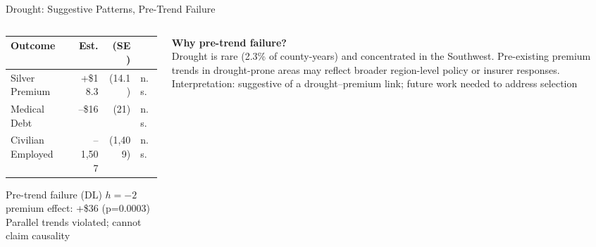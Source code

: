 \documentclass[aspectratio=169,11pt]{beamer}
\newcommand{\tealtext}[1]{{\color{Teal}#1}}
\newcommand{\graytext}[1]{{\color{WarmGray}#1}}
\begin{document}
\begin{frame}{Drought: Suggestive Patterns, Pre-Trend Failure}
  \begin{columns}[T]
    \begin{column}{0.56\textwidth}
      \small
      \begin{tabular}{lrrl}
        \toprule
        Outcome & Est. & (SE) & \\
        \midrule
        Silver Premium & +\$18.3 & (14.1) & \graytext{n.s.} \\
        Medical Debt & --\$16 & (21) & \graytext{n.s.} \\
        Civilian Employed & --1,507 & (1,409) & \graytext{n.s.} \\
        \bottomrule
      \end{tabular}
      \vspace{0.5em}
      \begin{alertblock}{Pre-trend failure (DL)}
        $h=-2$ premium effect: +\$36 (p=0.0003)\\
        \graytext{\footnotesize Parallel trends violated; cannot claim causality}
      \end{alertblock}
    \end{column}
    \begin{column}{0.40\textwidth}
      \textbf{Why pre-trend failure?}\\[0.3em]
      Drought is rare (2.3\% of county-years) and concentrated in the Southwest. Pre-existing premium trends in drought-prone areas may reflect broader region-level policy or insurer responses.\\[0.5em]
      \tealtext{Interpretation: suggestive of a drought--premium link; future work needed to address selection}
    \end{column}
  \end{columns}
\end{frame}
\end{document}

